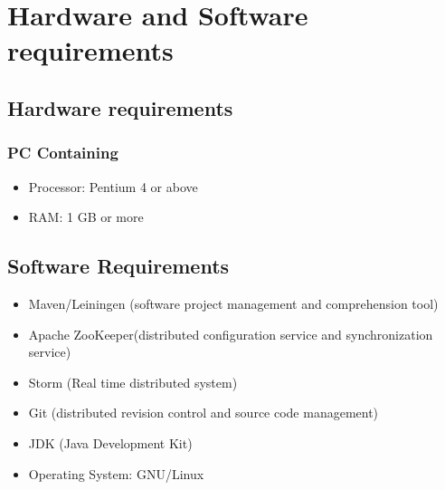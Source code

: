 \chapter{Hardware and Software requirements} 
\thispagestyle{plain} 

\section{Hardware requirements} 
\subsection*{ PC Containing}
\begin{itemize}
\item Processor: Pentium 4 or above\\
\item RAM: 1 GB or more\\
\end{itemize}

\section{Software Requirements} 
\begin{itemize}
\item Maven/Leiningen (software project management and comprehension tool)\\
\item Apache ZooKeeper(distributed configuration service and synchronization service)\\
\item Storm (Real time distributed system)\\
\item Git (distributed revision control and source code management)\\
\item JDK (Java Development Kit)\\
\item Operating System:  GNU/Linux\\
\end{itemize}

